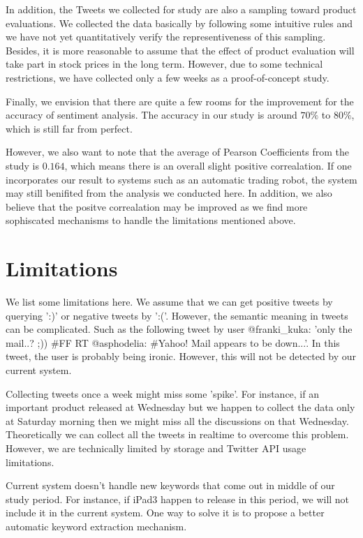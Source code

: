 \documentclass[12pt]{article}
\begin{document}
In addition, the Tweets we collected for study are also a sampling toward product evaluations. We collected the data basically by following some intuitive rules and we have not yet quantitatively verify the representiveness of this sampling. Besides, it is more reasonable to assume that the effect of product evaluation will take part in stock prices in the long term. However, due to some technical restrictions, we have collected only a few weeks as a proof-of-concept study.

Finally, we envision that there are quite a few rooms for the improvement for the accuracy of sentiment analysis. The accuracy in our study is around $70\%$ to $80\%$, which is still far from perfect.

However, we also want to note that the average of Pearson Coefficients from the study is $0.164$, which means there is an overall slight positive correalation. If one incorporates our result to systems such as an automatic trading robot, the system may still benifited from the analysis we conducted here. In addition, we also believe that the positve correalation may be improved as we find more sophiscated mechanisms to handle the limitations mentioned above.

\section{Limitations}
We list some limitations here. We assume that we can get positive tweets by querying ':)' or negative tweets by ':('. However, the semantic meaning in tweets can be complicated. Such as the following tweet by user @franki\_kuka: 'only the mail..? ;)) \#FF RT @asphodelia: \#Yahoo! Mail appears to be down...'. In this tweet, the user is probably being ironic. However, this will not be detected by our current system.

Collecting tweets once a week might miss some 'spike'. For instance, if an important product released at Wednesday but we happen to collect the data only at Saturday morning then we might miss all the discussions on that Wednesday. Theoretically we can collect all the tweets in realtime to overcome this problem. However, we are technically limited by storage and Twitter API usage limitations.

Current system doesn't handle new keywords that come out in middle of our study period. For instance, if iPad3 happen to release in this period, we will not include it in the current system. One way to solve it is to propose a better automatic keyword extraction mechanism.
\end{document}
